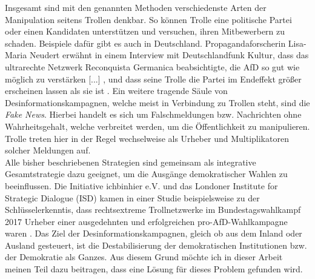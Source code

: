 Insgesamt sind mit den genannten Methoden verschiedenste Arten der Manipulation seitens Trollen denkbar. So können Trolle eine politische Partei oder einen Kandidaten unterstützen und versuchen, ihren Mitbewerbern zu schaden. Beispiele dafür gibt es auch in Deutschland. Propagandaforscherin Lisa-Maria Neudert erwähnt in einem Interview mit Deutschlandfunk Kultur, dass das ultrarechte Netzwerk \glqq Reconquista Germanica\grqq{} beabsichtigte, \glqq die AfD so gut wie möglich zu verstärken [...] \grqq{}, und dass seine Trolle die Partei im Endeffekt \glqq größer erscheinen lassen als sie ist\grqq{} \citep{DFL17}. Ein weitere tragende Säule von Desinformationskampagnen, welche meist in Verbindung zu Trollen steht, sind die \textit{Fake News}. Hierbei handelt es sich um Falschmeldungen bzw. Nachrichten ohne Wahrheitsgehalt, welche verbreitet werden, um die Öffentlichkeit zu manipulieren. Trolle treten hier in der Regel wechselweise als Urheber und Multiplikatoren solcher Meldungen auf.\\
Alle bisher beschriebenen Strategien sind gemeinsam als integrative Gesamtstrategie dazu geeignet, um die Ausgänge demokratischer Wahlen zu beeinflussen. Die Initiative \glqq ichbinhier e.V.\grqq{} und das Londoner \glqq Institute for Strategic Dialogue\grqq{} (ISD) kamen in einer Studie beispielsweise zu der Schlüsselerkenntis, dass rechtsextreme Trollnetzwerke im Bundestagswahlkampf 2017 Urheber einer ausgedehnten und erfolgreichen \glqq pro-AfD-Wahlkampagne\grqq{} waren \citep{ISD18}. Das Ziel der Desinformationskampagnen, gleich ob aus dem Inland oder Ausland gesteuert, ist die Destabilisierung der demokratischen Institutionen bzw. der Demokratie als Ganzes. Aus diesem Grund möchte ich in dieser Arbeit meinen Teil dazu beitragen, dass eine Lösung für dieses Problem gefunden wird.  
